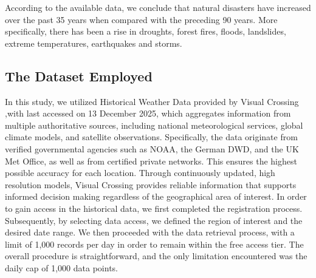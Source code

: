 \documentclass[12pt]{Definitions/academia}
\begin{document}
According to the available data, we conclude that natural disasters
have increased over the past 35 years when compared with the preceding
90 years. More specifically, there has been a rise in droughts, forest
fires, floods, landslides, extreme temperatures, earthquakes and storms.

\clearpage
\subsection{\textmd{The Dataset Employed }}
\vspace{-4em}
In this study, we utilized Historical Weather Data provided by Visual
Crossing \cite{Visual Crossing},with last accessed on
13 December 2025, which aggregates information from multiple authoritative
sources, including national meteorological services, global climate
models, and satellite observations. Specifically, the data originate 
from verified governmental agencies such as NOAA, the German DWD, 
and the UK Met Office, as well as from certified private networks. 
This ensures the highest possible accuracy for each location. 
Through continuously updated, high resolution models,
 Visual Crossing provides reliable information that supports informed 
 decision making regardless of the geographical area of interest.
 In order to gain access in the historical data, we first completed 
 the registration process. Subsequently,
by selecting data access, we defined the region of interest and the
desired date range. We then proceeded with the data retrieval process,
with a limit of 1,000 records per day in order to remain within the
free access tier. The overall procedure is straightforward, and the
only limitation encountered was the daily cap of 1,000 data points.
\end{document}
